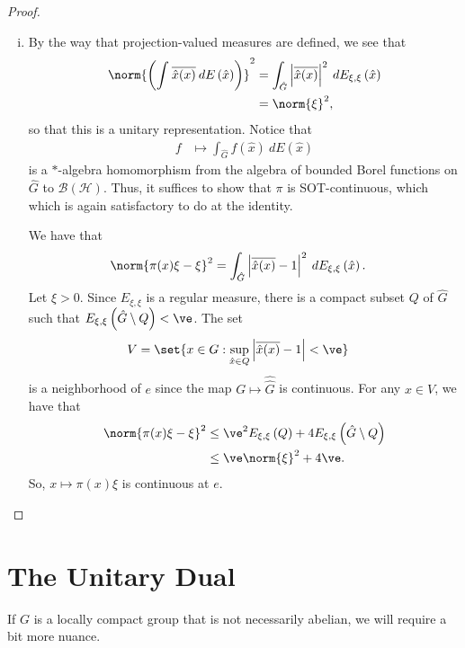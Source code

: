 \documentclass[10pt]{mypackage}
\begin{document}
\begin{proof}
\begin{enumerate}[(i)]
    \item By the way that projection-valued measures are defined, we see that
      \begin{align*}
        \norm{\left( \int_{}^{} \overline{\hat{x}(x)}\:dE\left( \hat{x} \right) \right)}^2 &= \int_{\hat{G}}^{} \left\vert \overline{\hat{x}(x)} \right\vert^2\:dE_{\xi,\xi}\left(\hat{x}\right)\\
                                                                                           &= \norm{\xi}^2,
      \end{align*}  
      so that this is a unitary representation. Notice that
      \begin{align*}
        f &\mapsto \int_{\hat{G}}^{} f\left( \hat{x} \right)\:dE\left( \hat{x} \right)
      \end{align*}
      is a $\ast$-algebra homomorphism from the algebra of bounded Borel functions on $\hat{G}$ to $ \mathcal{B}\left( \mathscr{H} \right) $. Thus, it suffices to show that $\pi$ is SOT-continuous, which which is again satisfactory to do at the identity.

      We have that
      \begin{align*}
        \norm{\pi(x)\xi-\xi}^2 &= \int_{\hat{G}}^{} \left\vert \overline{\hat{x}(x)}-1 \right\vert^2\:dE_{\xi,\xi}\left( \hat{x} \right).
      \end{align*}
      Let $\xi > 0$. Since $E_{\xi,\xi}$ is a regular measure, there is a compact subset $Q$ of $\hat{G}$ such that $E_{\xi,\xi}\left( \hat{G}\setminus Q \right) < \ve$. The set
      \begin{align*}
        V &= \set{x\in G : \sup_{\hat{x}\in Q}\left\vert \overline{\hat{x}(x)}-1 \right\vert < \ve}
      \end{align*}
      is a neighborhood of $e$ since the map $G\mapsto \hat{\hat{G}}$ is continuous. For any $x\in V$, we have that
      \begin{align*}
        \norm{\pi(x)\xi-\xi}^2 &\leq \ve^2 E_{\xi,\xi}\left( Q \right) + 4E_{\xi,\xi}\left( \hat{G}\setminus Q \right)\\
                               &\leq \ve \norm{\xi}^2 + 4\ve.
      \end{align*}
      So, $x\mapsto \pi(x)\xi$ is continuous at $e$.
  \end{enumerate}
\end{proof}
\section{The Unitary Dual}%
If $G$ is a locally compact group that is not necessarily abelian, we will require a bit more nuance.
\end{document}
